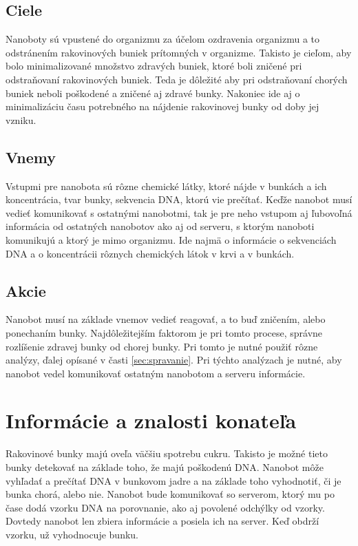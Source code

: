 \documentclass[10pt,twoside,slovak,a4paper]{article}
\begin{document}
\subsection{Ciele}
Nanoboty sú vpustené do organizmu za účelom ozdravenia organizmu a to odstránením rakovinových buniek prítomných v organizme. Takisto je cieľom, aby bolo minimalizované množstvo zdravých buniek, ktoré boli zničené pri odstraňovaní rakovinových buniek. Teda je dôležité aby pri odstraňovaní chorých buniek neboli poškodené a zničené aj zdravé bunky. Nakoniec ide aj o minimalizáciu času potrebného na nájdenie rakovinovej bunky od doby jej vzniku.

\subsection{Vnemy}
Vstupmi pre nanobota sú rôzne chemické látky, ktoré nájde v bunkách a ich koncentrácia, tvar bunky, sekvencia DNA, ktorú vie prečítať. Keďže nanobot musí vedieť komunikovať s ostatnými nanobotmi, tak je pre neho vstupom aj ľubovoľná informácia od ostatných nanobotov ako aj od serveru, s ktorým nanoboti komunikujú a ktorý je mimo organizmu. Ide najmä o informácie o sekvenciách DNA a o koncentrácii rôznych chemických látok v krvi a v bunkách.

\subsection{Akcie}
Nanobot musí na základe vnemov vedieť reagovať, a to buď zničením, alebo ponechaním bunky. Najdôležitejším faktorom je pri tomto procese, správne rozlíšenie zdravej bunky od chorej bunky. Pri tomto je nutné použiť rôzne analýzy, ďalej opísané v časti \ref{sec:spravanie}. Pri týchto analýzach je nutné, aby nanobot vedel komunikovať ostatným nanobotom a serveru informácie.


\section{Informácie a znalosti konateľa}
\label{sec:znalosti}
Rakovinové bunky majú oveľa väčšiu spotrebu cukru. Takisto je možné tieto bunky detekovať na základe toho, že majú poškodenú DNA. Nanobot môže vyhľadať a prečítať DNA v bunkovom jadre a na základe toho vyhodnotiť, či je bunka chorá, alebo nie.
\cite{Wikipedia-nador,cancer-cell-metabolism}
Nanobot bude komunikovať so serverom, ktorý mu po čase dodá vzorku DNA na porovnanie, ako aj povolené odchýlky od vzorky. Dovtedy nanobot len zbiera informácie a posiela ich na server. Keď obdrží vzorku, už vyhodnocuje bunku.
\end{document}
